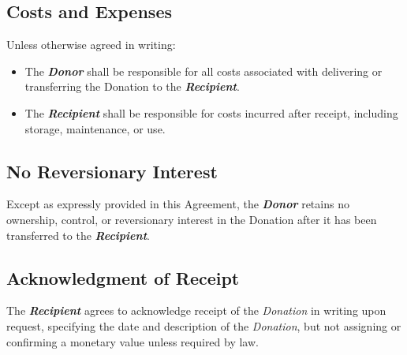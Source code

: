 \subsection{Costs and Expenses}
Unless otherwise agreed in writing:
\begin{itemize}
  \item The \textbf{\textit{Donor}} shall be responsible for all costs associated with delivering or transferring the Donation to the \textbf{\textit{Recipient}}.
  \item The \textbf{\textit{Recipient}} shall be responsible for costs incurred after receipt, including storage, maintenance, or use.
\end{itemize}

\subsection{No Reversionary Interest}
Except as expressly provided in this Agreement, the \textbf{\textit{Donor}} retains no ownership, control, or reversionary interest in the Donation after it has been transferred to the \textbf{\textit{Recipient}}.

\subsection{Acknowledgment of Receipt}
The \textbf{\textit{Recipient}} agrees to acknowledge receipt of the \textit{Donation} in writing upon request, specifying the date and description of the \textit{Donation}, but not assigning or confirming a monetary value unless required by law.


